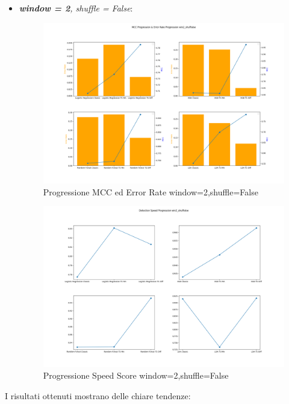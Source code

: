 \begin{itemize}
    \newpage
    \item \textit{\textbf{window = 2}, shuffle = False}:
    \begin{figure}[H]
    \centering
    \includegraphics[width=0.94\linewidth]{MCC_Progression_win2_shufFalse.png}
    \caption{Progressione MCC ed Error Rate window=2,shuffle=False}
    \label{fig:enter-label}
    \end{figure}
    \begin{figure}[H]
    \centering
    \includegraphics[width=0.94\linewidth]{Speed_Progression_win2_shufFalse.png}
    \caption{Progressione Speed Score window=2,shuffle=False}
    \label{fig:enter-label}
    \end{figure}
\end{itemize}

\newpage
I risultati ottenuti mostrano delle chiare tendenze:

